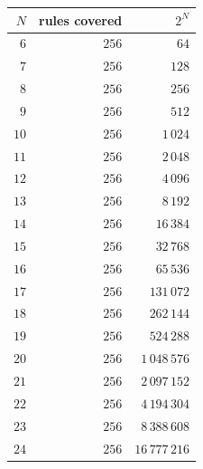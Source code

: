 \begin{tabular}{rrr}
\hline
$N$ & rules covered & $2^N$ \\
\hline
$6$ & $256$ & $64$ \\
$7$ & $256$ & $128$ \\
$8$ & $256$ & $256$ \\
$9$ & $256$ & $512$ \\
$10$ & $256$ & $1\,024$ \\
$11$ & $256$ & $2\,048$ \\
$12$ & $256$ & $4\,096$ \\
$13$ & $256$ & $8\,192$ \\
$14$ & $256$ & $16\,384$ \\
$15$ & $256$ & $32\,768$ \\
$16$ & $256$ & $65\,536$ \\
$17$ & $256$ & $131\,072$ \\
$18$ & $256$ & $262\,144$ \\
$19$ & $256$ & $524\,288$ \\
$20$ & $256$ & $1\,048\,576$ \\
$21$ & $256$ & $2\,097\,152$ \\
$22$ & $256$ & $4\,194\,304$ \\
$23$ & $256$ & $8\,388\,608$ \\
$24$ & $256$ & $16\,777\,216$ \\
\hline
\end{tabular}
